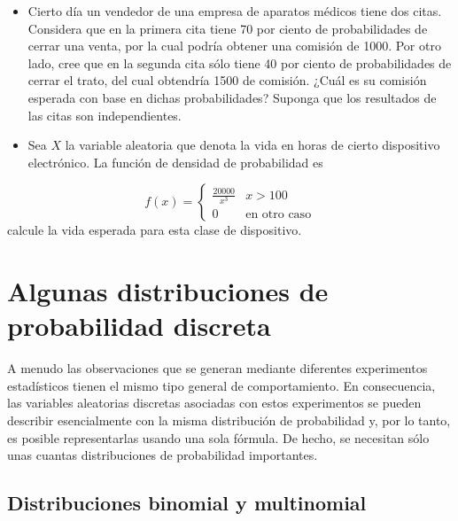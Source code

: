 \documentclass[11pt]{article}
\begin{document}
\begin{itemize}
\item
  Cierto día un vendedor de una empresa de aparatos médicos tiene dos
  citas. Considera que en la primera cita tiene 70 por ciento de
  probabilidades de cerrar una venta, por la cual podría obtener una
  comisión de 1000. Por otro lado, cree que en la segunda cita sólo
  tiene 40 por ciento de probabilidades de cerrar el trato, del cual
  obtendría 1500 de comisión. ¿Cuál es su comisión esperada con base en
  dichas probabilidades? Suponga que los resultados de las citas son
  independientes.
\item
  Sea \(X\) la variable aleatoria que denota la vida en horas de cierto
  dispositivo electrónico. La función de densidad de probabilidad es
\end{itemize}

\begin{equation}
     \label{eq:aqui4}
     f(x)= \left\{
           \begin{array}{ll}
             \frac{20000}{x^3}  &  x >100 \\
           0   & \text{en otro caso} 
           \end{array}
         \right.
 \end{equation} calcule la vida esperada para esta clase de dispositivo.

    \hypertarget{algunas-distribuciones-de-probabilidad-discreta}{%
\section{Algunas distribuciones de probabilidad
discreta}\label{algunas-distribuciones-de-probabilidad-discreta}}

A menudo las observaciones que se generan mediante diferentes
experimentos estadísticos tienen el mismo tipo general de
comportamiento. En consecuencia, las variables aleatorias discretas
asociadas con estos experimentos se pueden describir esencialmente con
la misma distribución de probabilidad y, por lo tanto, es posible
representarlas usando una sola fórmula. De hecho, se necesitan sólo unas
cuantas distribuciones de probabilidad importantes.

\hypertarget{distribuciones-binomial-y-multinomial}{%
\subsection{Distribuciones binomial y
multinomial}\label{distribuciones-binomial-y-multinomial}}
\end{document}
